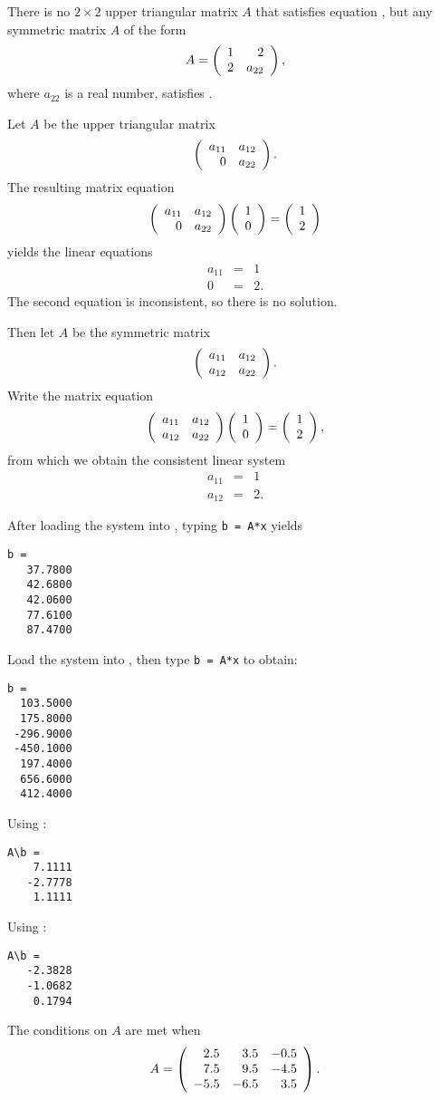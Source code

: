 \ans There is no $2 \times 2$ upper triangular matrix $A$ that
satisfies equation , but any symmetric matrix $A$ of the form
\[ A = \left(\begin{array}{rr} 1 & 2\\ 2 &a_{22}\end{array}\right), \]
where $a_{22}$ is a real number, satisfies .

\soln Let $A$ be the upper triangular matrix
\[ \left(\begin{array}{rr} a_{11} & a_{12}\\ 0 &a_{22}\end{array}\right). \]
The resulting matrix equation
\[ \left(\begin{array}{rr} a_{11} & a_{12}\\ 0 &a_{22}\end{array}\right)
\left(\begin{array}{r} 1 \\ 0\end{array}\right) = \left(\begin{array}{r} 1 \\ 2\end{array}\right) \]
yields the linear equations
\[ \begin{array}{rcl}
a_{11} & = & 1 \\
0 & = & 2.\end{array} \]
The second equation is inconsistent, so there is no solution.

\para Then let $A$ be the symmetric matrix
\[ \left(\begin{array}{rr} a_{11} & a_{12}\\ a_{12} &a_{22}\end{array}\right). \]
Write the matrix equation
\[ \left(\begin{array}{rr} a_{11} & a_{12}\\ a_{12} &a_{22}\end{array}\right)
\left(\begin{array}{r} 1 \\ 0\end{array}\right) = \left(\begin{array}{r} 1 \\ 2\end{array}\right), \]
from which we obtain the consistent linear system
\[ \begin{array}{rcl}
a_{11} & = & 1 \\
a_{12} & = & 2.\end{array} \]

 After loading the system into \Matlabp, typing
{\tt b = A*x} yields
\begin{verbatim}
b =
   37.7800
   42.6800
   42.0600
   77.6100
   87.4700
\end{verbatim}

 Load the system into \Matlabp, then type {\tt b = A*x}
to obtain:
\begin{verbatim}
b =
  103.5000
  175.8000
 -296.9000
 -450.1000
  197.4000
  656.6000
  412.4000
\end{verbatim}

 Using \Matlabp:
\begin{verbatim}
A\b =
    7.1111
   -2.7778
    1.1111
\end{verbatim}

 Using \Matlabp:
\begin{verbatim}
A\b =
   -2.3828
   -1.0682
    0.1794
\end{verbatim}

\ans The conditions on $A$ are met when
\[ A = \left(\begin{array}{rrr} 2.5 & 3.5 & -0.5 \\ 7.5 & 9.5 & -4.5 \\ -5.5 & -6.5 & 3.5\end{array}\right). \]

